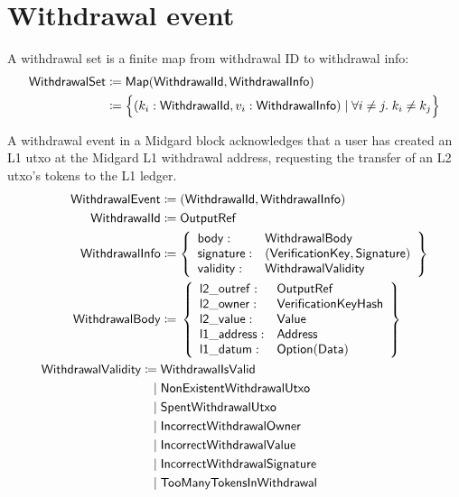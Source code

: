 \documentclass[../midgard.tex]{subfiles}
\begin{document}
\section{Withdrawal event}
\label{h:withdrawal-event}

A withdrawal set is a finite map from withdrawal ID to withdrawal info:
\begin{align*}
    \mathsf{WithdrawalSet} &\coloneq \mathsf{Map(WithdrawalId, WithdrawalInfo)} \\
      &\coloneq \Bigl\{
        (k_i: \mathsf{WithdrawalId}, v_i: \mathsf{WithdrawalInfo}) \mid \forall i \neq j.\; k_i \neq k_j
    \Bigr\}
\end{align*}

A withdrawal event in a Midgard block acknowledges that a user has created an L1 utxo at the Midgard L1 withdrawal address, requesting the transfer of an L2 utxo's tokens to the L1 ledger.
\begingroup
\allowdisplaybreaks{}
\begin{align*}
    \mathsf{WithdrawalEvent} &\coloneq \mathsf{(WithdrawalId, WithdrawalInfo)} \\
    \mathsf{WithdrawalId} &\coloneq \mathsf{OutputRef} \\
    \mathsf{WithdrawalInfo} &\coloneq \left\{
        \begin{array}{ll}
            \mathsf{body} :& \mathsf{WithdrawalBody} \\
            \mathsf{signature} :& \mathsf{(VerificationKey, Signature)} \\
            \mathsf{validity} :& \mathsf{WithdrawalValidity} \\
        \end{array} \right\}\\
    \mathsf{WithdrawalBody} &\coloneq{} \left\{
        \begin{array}{ll}
            \mathsf{l2\_outref} :& \mathsf{OutputRef} \\
            \mathsf{l2\_owner} :& \mathsf{VerificationKeyHash} \\
            \mathsf{l2\_value} :& \mathsf{Value} \\
            \mathsf{l1\_address} : & \mathsf{Address} \\
            \mathsf{l1\_datum} : & \mathsf{Option(Data)}
        \end{array} \right\}\\
    \mathsf{WithdrawalValidity} \coloneq\;& \mathsf{WithdrawalIsValid} \\
                               \mid\;& \mathsf{NonExistentWithdrawalUtxo} \\
                               \mid\;& \mathsf{SpentWithdrawalUtxo} \\
                               \mid\;& \mathsf{IncorrectWithdrawalOwner} \\
                               \mid\;& \mathsf{IncorrectWithdrawalValue} \\
                               \mid\;& \mathsf{IncorrectWithdrawalSignature} \\
                               \mid\;& \mathsf{TooManyTokensInWithdrawal}
\end{align*}
\endgroup
\end{document}
